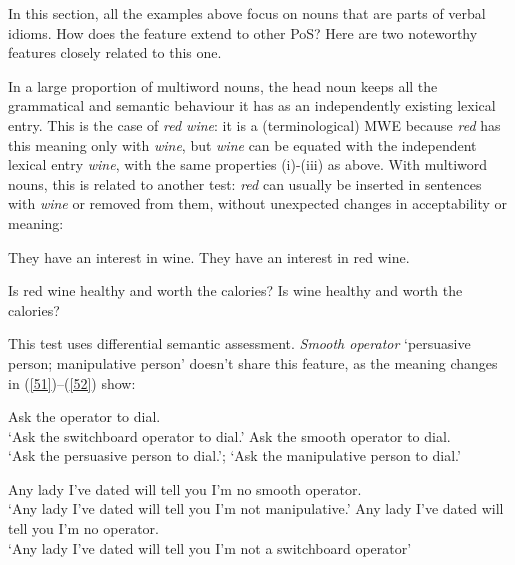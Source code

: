 \documentclass[output=paper]{langsci/langscibook}
\begin{document}
In this section, all the examples above focus on nouns that are parts of verbal idioms. How does the feature extend to other PoS? Here are two noteworthy features closely related to this one. 

In a large proportion of multiword nouns, the head noun keeps all the grammatical and semantic behaviour it has as an independently existing lexical entry. This is the case of \textit{red wine}: it is a (terminological) MWE because \textit{red} has this meaning only with \textit{wine}, but \textit{wine} can be equated with the independent lexical entry \textit{wine}, with the same properties (i)-(iii) as above. With multiword nouns, this is related to another test: \textit{red} can usually be inserted in sentences with \textit{wine} or removed from them, without unexpected changes in acceptability or meaning:

\begin{exe}
\ex \label{49}
\begin{xlist}
\ex \label{49a}
They have an interest in wine.
\ex \label{49b}
They have an interest in red wine.
\end{xlist}
\end{exe}

\begin{exe}
\ex \label{50}
\begin{xlist}
\ex \label{50a}
Is red wine healthy and worth the calories?
\ex \label{50b}
Is wine healthy and worth the calories?
\end{xlist}
\end{exe}

This test uses differential semantic assessment. \textit{Smooth operator} ‘persuasive person; manipulative person’ doesn’t share this feature, as the meaning changes in (\ref{51})–(\ref{52}) show:


\begin{exe}
\ex \label{51}
\begin{xlist}
\ex \label{51a}
Ask the operator to dial.\\
 ‘Ask the switchboard operator to dial.’
\ex \label{51b}
Ask the smooth operator to dial.\\
‘Ask the persuasive person to dial.’; ‘Ask the manipulative person to dial.’
\end{xlist}
\end{exe}

\begin{exe}
\ex \label{52}
\begin{xlist}
\ex \label{52a}
Any lady I’ve dated will tell you I’m no smooth operator.\\
‘Any lady I’ve dated will tell you I’m not manipulative.’
\ex \label{52b}
Any lady I’ve dated will tell you I’m no operator.\\
‘Any lady I’ve dated will tell you I’m not a switchboard operator’
\end{xlist}
\end{exe}
\end{document}
